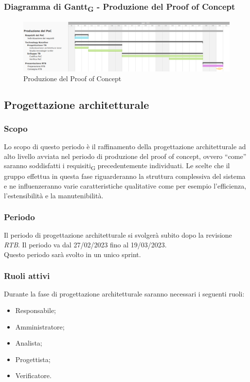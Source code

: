 \subsubsection{Diagramma di Gantt\textsubscript{G} - Produzione del Proof of Concept}

\begin{figure}[H]
\centering
\includegraphics[width=\textwidth]{img/4_produzione.png}
\caption{Produzione del Proof of Concept}
\end{figure}

\subsection{Progettazione architetturale}
\subsubsection{Scopo}
Lo scopo di questo periodo è il raffinamento della progettazione architetturale ad alto livello avviata nel periodo di produzione del proof of concept, ovvero “come” saranno soddisfatti i requisiti\textsubscript{G} precedentemente individuati.
Le scelte che il gruppo effettua in questa fase riguarderanno la struttura complessiva del sistema e ne influenzeranno varie caratteristiche qualitative come per esempio l’efficienza, l’estensibilità e la manutenibilità.

\subsubsection{Periodo}
Il periodo di progettazione architetturale si svolgerà subito dopo la revisione \textit{RTB}. Il periodo va dal 27/02/2023 fino al 19/03/2023.\\
Questo periodo sarà svolto in un unico sprint.

\subsubsection{Ruoli attivi}
Durante la fase di progettazione architetturale saranno necessari i seguenti ruoli:
\begin{itemize}
	\item Responsabile;
    \item Amministratore;
    \item Analista;
    \item Progettista;
    \item Verificatore.
\end{itemize}


